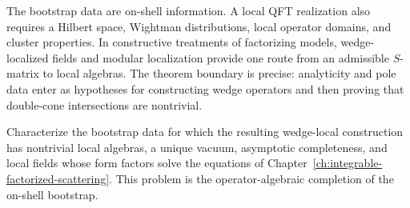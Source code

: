 The bootstrap data are on-shell information.  A local QFT realization also
requires a Hilbert space, Wightman distributions, local operator domains, and
cluster properties.  In constructive treatments of factorizing models, wedge-
localized fields and modular localization provide one route from an
admissible \(S\)-matrix to local algebras.  The theorem boundary is precise:
analyticity and pole data enter as hypotheses for constructing wedge
operators and then proving that double-cone intersections are nontrivial.

\begin{openproblem}
\label{op:bootstrap-completeness-local-algebras}
Characterize the bootstrap data for which the resulting wedge-local
construction has nontrivial local algebras, a unique vacuum, asymptotic
completeness, and local fields whose form factors solve the equations of
Chapter~\ref{ch:integrable-factorized-scattering}.  This problem is the
operator-algebraic completion of the on-shell bootstrap.
\end{openproblem}
